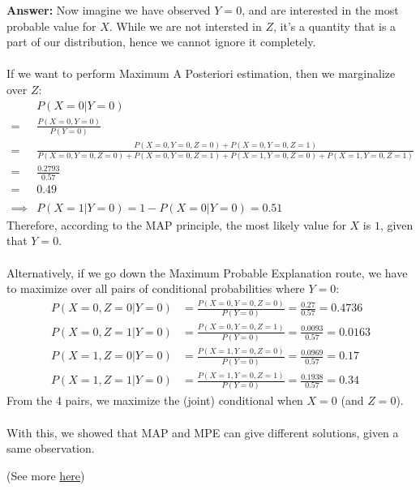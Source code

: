 \documentclass{article}
\newenvironment{QandA}{\begin{enumerate}[label=\arabic*.]}{\end{enumerate}}
\newenvironment{InnerQandA}{\begin{enumerate}[label=\roman*.]}{\end{enumerate}}
\newenvironment{answer}{\par\normalfont \textbf{Answer:}}{}
\newcommand{\g}{\vert}
\begin{document}
\begin{QandA}
\begin{InnerQandA}
\begin{answer}
            Now imagine we have observed $Y = 0$, and are interested in the most probable value for $X$. While we are not intersted in $Z$, it's a quantity that is a part of our distribution, hence we cannot ignore it completely. \\\\
            If we want to perform Maximum A Posteriori estimation, then we marginalize over $Z$:
            \begin{align*}
                &P(X = 0 \g Y = 0) \\
                = &\frac{P(X = 0, Y = 0)}{P(Y = 0)} \\
                = &\frac{P(X=0, Y=0, Z=0) + P(X = 0, Y = 0, Z = 1)}{P(X = 0, Y = 0, Z = 0) + P(X = 0, Y = 0, Z = 1) + P(X = 1, Y = 0, Z = 0) + P(X = 1, Y = 0, Z = 1)} \\
                = &\frac{0.2793}{0.57} \\
                = &0.49 \\\\
                \implies &P(X=1 \g Y=0) = 1 - P(X = 0 \g Y=0) = 0.51
            \end{align*}
            Therefore, according to the MAP principle, the most likely value for $X$ is $1$, given that $Y = 0$. \\\\
            Alternatively, if we go down the Maximum Probable Explanation route, we have to maximize over all pairs of conditional probabilities where $Y = 0$:
            \begin{align*}
                P(X = 0, Z = 0 \g Y = 0) &= \frac{P(X = 0, Y=0, Z=0)}{P(Y=0)} = \frac{0.27}{0.57} = 0.4736 \\
                P(X = 0, Z = 1 \g Y = 0) &= \frac{P(X = 0, Y=0, Z=1)}{P(Y=0)} = \frac{0.0093}{0.57} = 0.0163 \\
                P(X = 1, Z = 0 \g Y = 0) &= \frac{P(X = 1, Y=0, Z=0)}{P(Y=0)} = \frac{0.0969}{0.57} = 0.17 \\
                P(X = 1, Z = 1 \g Y = 0) &= \frac{P(X = 1, Y=0, Z=1)}{P(Y=0)} = \frac{0.1938}{0.57} = 0.34
            \end{align*}
            From the 4 pairs, we maximize the (joint) conditional when $X=0$ (and $Z=0$).  \\\\
            With this, we showed that MAP and MPE can give different solutions, given a same observation.

        
            (See more \href{https://www.quora.com/What-are-the-cases-in-which-Most-Probable-Explanation-MPE-tasks-do-not-generalize-to-Maximum-A-Posteriori-MAP-task}{here})
        \end{answer}
    \end{InnerQandA}


\end{QandA}
\end{document}
